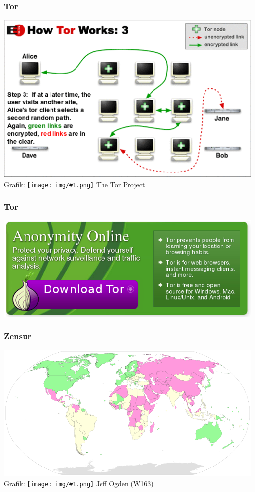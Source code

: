 \documentclass[12pt]{beamer}
\newcommand{\cc}[1]{\texttt{[image: img/\#1.png]}\hspace{1mm}}
\begin{document}
\begin{frame}
    \frametitle{Tor}
    \includegraphics[height=0.7\textheight]{img/tor3.png}
    \\{\small \href{https://www.torproject.org/images/htw3.png}{Grafik}: \href{https://creativecommons.org/licenses/by/3.0/us/}{\cc{by}} The Tor Project}
\end{frame}

\begin{frame}
  \frametitle{Tor}
  \includegraphics[height=0.5\textheight]{img/tor-banner.png}
\end{frame}

\begin{frame}
    \frametitle{Zensur}
    \includegraphics[height=0.7\textheight]{img/zensur.png}
    \\{\small \href{http://upload.wikimedia.org/wikipedia/commons/5/51/RWB-PressFreedomIndex2013-WorldMap.svg}{Grafik}: \href{http://creativecommons.org/licenses/by-sa/3.0/deed.en}{\cc{by-sa}} Jeff Ogden (W163)}
\end{frame}
\end{document}
